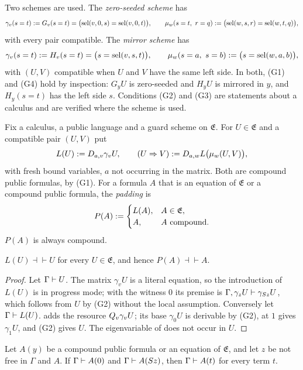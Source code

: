 Two schemes are used.  The \emph{zero-seeded scheme} has
\[
 \gamma_v(s=t)\mathrel{:=} G_v(s=t)=\bigl(\operatorname{sel}(v,0,s)=\operatorname{sel}(v,0,t)\bigr),
 \qquad
 \mu_w(s=t,\ r=q)\mathrel{:=}\bigl(\operatorname{sel}(w,s,r)=\operatorname{sel}(w,t,q)\bigr),
\]
with every pair compatible.  The \emph{mirror scheme} has
\[
 \gamma_v(s=t)\mathrel{:=} H_v(s=t)=\bigl(s=\operatorname{sel}(v,s,t)\bigr),
 \qquad
 \mu_w(s=a,\ s=b)\mathrel{:=}\bigl(s=\operatorname{sel}(w,a,b)\bigr),
\]
with $(U,V)$ compatible when $U$ and $V$ have the same left side.  In both,
(G1) and (G4) hold by inspection: $G_yU$ is zero-seeded and $H_yU$ is
mirrored in $y$, and $H_y(s=t)$ has the left side $s$.  Conditions (G2) and
(G3) are statements about a calculus and are verified where the scheme is
used.

Fix a calculus, a public language and a guard scheme on $\mathfrak E$.  For
$U\in\mathfrak E$ and a compatible pair $(U,V)$ put
\[
 L(U)\mathrel{:=}D_{a,v}\gamma_vU,
 \qquad
 (U\Rightarrow V)\mathrel{:=}D_{a,w}L\bigl(\mu_w(U,V)\bigr),
\]
with fresh bound variables, $a$ not occurring in the matrix.  Both are
compound public formulas, by (G1).  For a formula $A$ that is an equation of
$\mathfrak E$ or a compound public formula, the \emph{padding} is
\[
 P(A)\mathrel{:=}
 \begin{cases}
  L(A), & A\in\mathfrak E,\\
  A, & A \text{ compound}.
 \end{cases}
\]
$P(A)$ is always compound.

\begin{lemma}[Padding]
\label{guard:lem:pad}
$L(U)\dashv\vdash U$ for every $U\in\mathfrak E$, and hence
$P(A)\dashv\vdash A$.
\end{lemma}

\begin{proof}
Let $\Gamma\vdash U$.  The matrix $\gamma_vU$ is a literal equation, so the
introduction of $L(U)$ is in progress mode; with the witness $0$ its premise
is $\Gamma,\gamma_zU\vdash\gamma_{S z}U$, which follows from $U$ by
(G2) without the local assumption.  Conversely let $\Gamma\vdash L(U)$.
 adds the resource $Q_{v}\gamma_vU$; its base $\gamma_0U$ is
derivable by (G2),  at $1$ gives $\gamma_{1}U$, and (G2) gives
$U$.  The eigenvariable of  does not occur in $U$.
\end{proof}

\begin{lemma}
\label{guard:lem:nc}
Let $A(y)$ be a compound public formula or an equation of $\mathfrak E$, and
let $z$ be not free in $\Gamma$ and $A$.  If $\Gamma\vdash A(0)$ and
$\Gamma\vdash A(S z)$, then $\Gamma\vdash A(t)$ for every term $t$.
\end{lemma}


